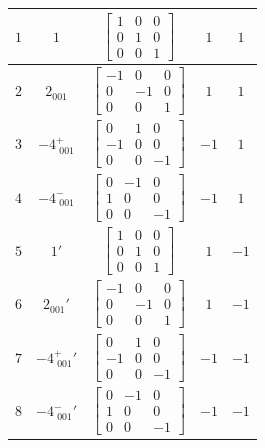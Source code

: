 \documentclass[fleqn,8pt]{jsarticle}
\begin{document}
\begin{longtable}{ccccc}
$ 1 $ & $ 1 $ & $ \begin{bmatrix} 1 & 0 & 0 \\ 0 & 1 & 0 \\ 0 & 0 & 1 \end{bmatrix} $ & $ 1 $ & $ 1 $ \\ \hline
$ 2 $ & $ 2{}_{001} $ & $ \begin{bmatrix} -1 & 0 & 0 \\ 0 & -1 & 0 \\ 0 & 0 & 1 \end{bmatrix} $ & $ 1 $ & $ 1 $ \\ \hline
$ 3 $ & $ -4^{+}_{\,\,001} $ & $ \begin{bmatrix} 0 & 1 & 0 \\ -1 & 0 & 0 \\ 0 & 0 & -1 \end{bmatrix} $ & $ -1 $ & $ 1 $ \\ \hline
$ 4 $ & $ -4^{-}_{\,\,001} $ & $ \begin{bmatrix} 0 & -1 & 0 \\ 1 & 0 & 0 \\ 0 & 0 & -1 \end{bmatrix} $ & $ -1 $ & $ 1 $ \\ \hline
$ 5 $ & $ 1{}' $ & $ \begin{bmatrix} 1 & 0 & 0 \\ 0 & 1 & 0 \\ 0 & 0 & 1 \end{bmatrix} $ & $ 1 $ & $ -1 $ \\ \hline
$ 6 $ & $ 2{}_{001}{}' $ & $ \begin{bmatrix} -1 & 0 & 0 \\ 0 & -1 & 0 \\ 0 & 0 & 1 \end{bmatrix} $ & $ 1 $ & $ -1 $ \\ \hline
$ 7 $ & $ -4^{+}_{\,\,001}{}' $ & $ \begin{bmatrix} 0 & 1 & 0 \\ -1 & 0 & 0 \\ 0 & 0 & -1 \end{bmatrix} $ & $ -1 $ & $ -1 $ \\ \hline
$ 8 $ & $ -4^{-}_{\,\,001}{}' $ & $ \begin{bmatrix} 0 & -1 & 0 \\ 1 & 0 & 0 \\ 0 & 0 & -1 \end{bmatrix} $ & $ -1 $ & $ -1 $ \\
\end{longtable}
\end{document}
